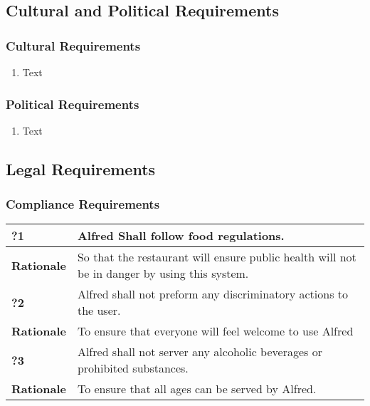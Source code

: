 \documentclass [11pt]{article}
\begin{document}
\subsection{Cultural and Political Requirements } 

\subsubsection{Cultural Requirements }
	\begin{enumerate}[label=\textbf{(\roman*)}]
		\item Text
	\end{enumerate}

\subsubsection{Political Requirements }
	\begin{enumerate}[label=\textbf{(\roman*)}]
		\item Text
	\end{enumerate}

\subsection{Legal Requirements}

\subsubsection{Compliance Requirements }

\begin{longtable}{| p{ } | p{ } | }\hline 
	\rowcolor{tableCell}\textbf{?1} & Alfred Shall follow food regulations. \\ \hline
	\textbf{Rationale} & So that the restaurant will ensure public health will not be in danger by using this system.\\ \hline 
	\rowcolor{tableCell}\textbf{?2} & Alfred shall not preform any discriminatory actions to the user. \\ \hline
	\textbf{Rationale} & To ensure that everyone will feel welcome to use Alfred\\ \hline 
	\rowcolor{tableCell}\textbf{?3} & Alfred shall not server any alcoholic beverages or prohibited substances. \\ \hline
	\textbf{Rationale} & To ensure that all ages can be served by Alfred.\\ \hline 
\end{longtable}
\end{document}
